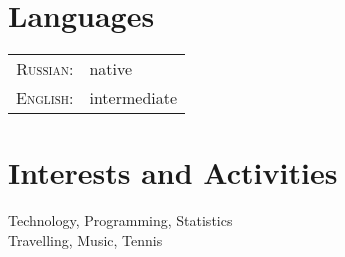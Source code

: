 \documentclass[a4paper,10pt]{article}
\begin{document}
\section{Languages}
\begin{tabular}{rl}
\textsc{Russian:}&native\\
\textsc{English:}&intermediate\\
\end{tabular}


\section{Interests and Activities}
Technology, Programming, Statistics\\
Travelling, Music, Tennis
\end{document}
